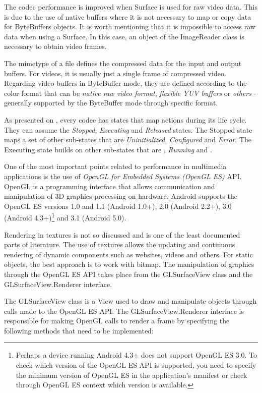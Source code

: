 \documentclass[runningheads]{llncs}
\begin{document}
The codec performance is improved when Surface is used for raw video data. This is due to the use of native buffers where it is not necessary to map or copy data for ByteBuffers objects. It is worth mentioning that it is impossible to access raw data when using a Surface. In this case, an object of the ImageReader class is necessary to obtain video frames.

The mimetype of a file defines the compressed data for the input and output buffers. For videos, it is usually just a single frame of compressed video. Regarding video buffers in ByteBuffer mode, they are defined according to the color format that can be \textit{native raw video format}, \textit{flexible YUV buffers} or \textit{others} - generally supported by the ByteBuffer mode through specific format.

As presented on \cite{MediaCodec}, every codec has states that map actions during its life cycle. They can assume the \textit{Stopped}, \textit{Executing} and \textit{Released} states. The Stopped state maps a set of other sub-states that are \textit{Uninitialized}, \textit{Configured} and \textit{Error}. The Executing state builds on other sub-states that are , \textit{Running} and .

One of the most important points related to performance in multimedia applications is the use of \textit{OpenGL for Embedded Systems (OpenGL ES)} API. OpenGL is a programming interface that allows communication and manipulation of 3D graphics processing on hardware. Android supports the OpenGL ES versions 1.0 and 1.1 (Android 1.0+), 2.0 (Android 2.2+), 3.0 (Android 4.3+)\footnote{Perhaps a device running Android 4.3+ does not support OpenGL ES 3.0. To check which version of the OpenGL ES API is supported, you need to specify the minimum version of OpenGL ES in the application's manifest or check through OpenGL ES context which version is available.} and 3.1 (Android 5.0).

Rendering in textures is not so discussed and is one of the least documented parts of literature. The use of textures allows the updating and continuous rendering of dynamic components such as websites, videos and others. For static objects, the best approach is to work with bitmap. The manipulation of graphics through the OpenGL ES API takes place from the GLSurfaceView class and the GLSurfaceView.Renderer interface.

The GLSurfaceView class is a View used to draw and manipulate objects through calls made to the OpenGL ES API. The GLSurfaceView.Renderer interface is responsible for making OpenGL calls to render a frame by specifying the following methods that need to be implemented:
\end{document}
